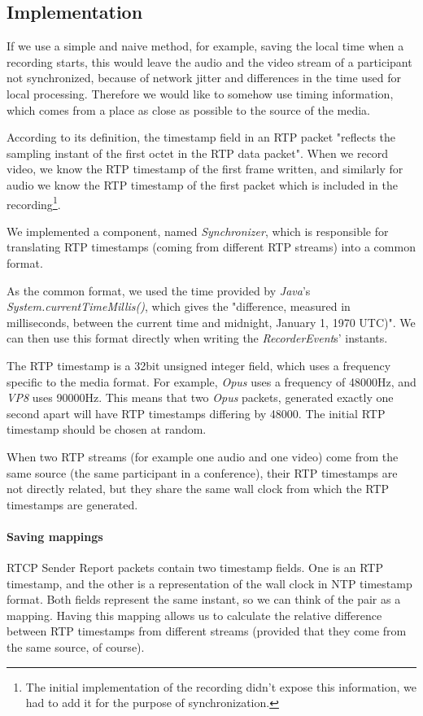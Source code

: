 \documentclass[twoside,openright,a4paper,12pt,english]{article}
\begin{document}
\subsection{Implementation}
If we use a simple and naive method, for example, saving the local time when a
recording starts, this would leave the audio and the video stream of a
participant not synchronized, because of network jitter and differences in the
time used for local processing. Therefore we would like to somehow use timing information,
which comes from a place as close as possible to the source of the media.

According to its definition, the timestamp field in an RTP packet "reflects the sampling instant of the
first octet in the RTP data packet"\cite{rtp}. When we record video, we know the
RTP timestamp of the first frame written, and similarly for audio we know the RTP timestamp of the
first packet which is included in the recording\footnote{The initial
implementation of the recording didn't expose this information, we had to add
it for the purpose of synchronization.}.

We implemented a component, named \emph{Synchronizer}, which is responsible for translating
RTP timestamps (coming from different RTP streams) into a common format.

As the common format, we used the time provided by \emph{Java}'s\\
\emph{System.currentTimeMillis()}, which gives the
"difference, measured in milliseconds, between the current time and midnight,
January 1, 1970 UTC)". We can then use this format directly when writing the
\emph{RecorderEvent}s' instants.

The RTP timestamp is a 32bit unsigned integer field, which uses a frequency
specific to the media format. For example, \emph{Opus} uses a frequency of
48000Hz, and \emph{VP8} uses 90000Hz. This means that two \emph{Opus} packets,
generated exactly one second apart will have RTP timestamps differing by 48000.
The initial RTP timestamp should be chosen at random.

When two RTP streams (for example one audio and one video) come from the same source
(the same participant in a conference), their RTP timestamps are not directly related,
but they share the same wall clock from which the RTP timestamps are generated.

\paragraph{Saving mappings}
RTCP Sender Report packets contain two timestamp fields. One is an RTP timestamp, and the
other is a representation of the wall clock in NTP timestamp format\cite{ntp}. Both fields
represent the same instant, so we can think of the pair as a mapping. Having this mapping allows us to
calculate the relative difference between RTP timestamps from different streams
(provided that they come from the same source, of course).
\end{document}
